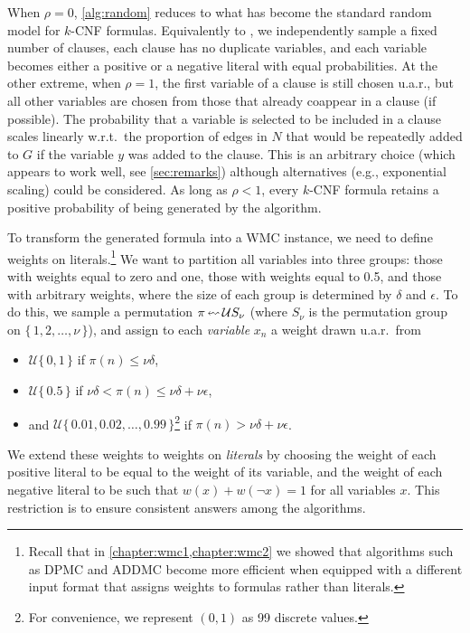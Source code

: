 When $\rho=0$, \cref{alg:random} reduces to what has become the standard random
model for $k$-CNF formulas. Equivalently to \citet{DBLP:journals/dam/FrancoP83},
we independently sample a fixed number of clauses, each clause has no duplicate
variables, and each variable becomes either a positive or a negative literal
with equal probabilities. At the other extreme, when $\rho = 1$, the first
variable of a clause is still chosen u.a.r., but all other variables are chosen
from those that already coappear in a clause (if possible). The probability that
a variable is selected to be included in a clause scales linearly w.r.t.\ the
proportion of edges in $N$ that would be repeatedly added to $G$ if the variable
$y$ was added to the clause. This is an arbitrary choice (which appears to work
well, see \cref{sec:remarks}) although alternatives (e.g., exponential scaling)
could be considered. As long as $\rho < 1$, every $k$-CNF formula retains a
positive probability of being generated by the algorithm.

To transform the generated formula into a WMC instance, we need to define
weights on literals.\footnote{Recall that in \cref{chapter:wmc1,chapter:wmc2} we
  showed that algorithms such as \textsc{DPMC} and \textsc{ADDMC}
  \citep{DBLP:conf/aaai/DudekPV20,DBLP:conf/cp/DudekPV20} become more efficient
  when equipped with a different input format that assigns weights to formulas
  rather than literals.} We want to partition all variables into three groups:
those with weights equal to zero and one, those with weights equal to 0.5, and
those with arbitrary weights, where the size of each group is determined by
$\delta$ and $\epsilon$. To do this, we sample a permutation
$\pi \leftlsquigarrow \mathcal{U}S_\nu$ (where $S_\nu$ is the permutation group
on $\{\, 1, 2, \dots, \nu \,\}$), and assign to each \emph{variable} $x_n$ a
weight drawn u.a.r.\ from
\begin{itemize}
  \item $\mathcal{U}\{\,0, 1\,\}$ if $\pi(n) \le \nu\delta$,
  \item $\mathcal{U}\{\,0.5\,\}$ if
        $\nu\delta < \pi(n) \le \nu\delta + \nu\epsilon$,
  \item and $\mathcal{U}\{\, 0.01, 0.02, \dots, 0.99 \,\}$\footnote{For
        convenience, we represent $(0, 1)$ as 99 discrete values.} if
        $\pi(n) > \nu\delta + \nu\epsilon$.
\end{itemize}
We extend these weights to weights on \emph{literals} by choosing the weight of
each positive literal to be equal to the weight of its variable, and the weight
of each negative literal to be such that $w(x) + w(\neg x) = 1$ for all
variables $x$. This restriction is to ensure consistent answers among the
algorithms.

